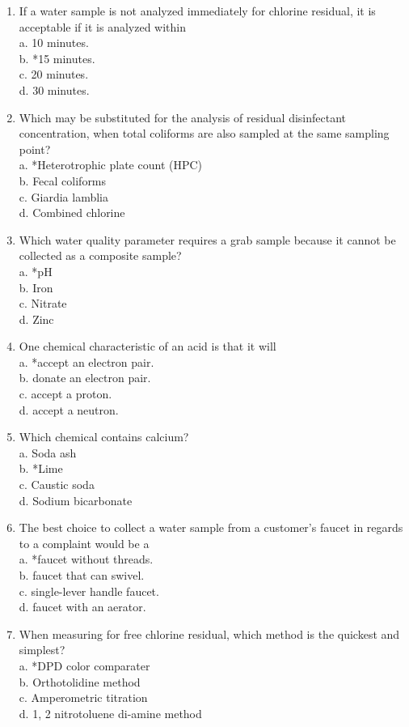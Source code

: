 \documentclass[10pt]{article}
\begin{document}
\begin{enumerate}
  \item If a water sample is not analyzed immediately for chlorine residual, it is acceptable if it is analyzed within\\
a. 10 minutes.\\
b. *15 minutes.\\
c. 20 minutes.\\
d. 30 minutes.

  \item Which may be substituted for the analysis of residual disinfectant concentration, when total coliforms are also sampled at the same sampling point?\\
a. *Heterotrophic plate count (HPC)\\
b. Fecal coliforms\\
c. Giardia lamblia\\
d. Combined chlorine

  \item Which water quality parameter requires a grab sample because it cannot be collected as a composite sample?\\
a. *$\mathrm{pH}$\\
b. Iron\\
c. Nitrate\\
d. Zinc 

	\item One chemical characteristic of an acid is that it will\\
a. *accept an electron pair.\\
b. donate an electron pair.\\
c. accept a proton.\\
d. accept a neutron.

  \item Which chemical contains calcium?\\
a. Soda ash\\
b. *Lime\\
c. Caustic soda\\
d. Sodium bicarbonate

  \item The best choice to collect a water sample from a customer's faucet in regards to a complaint would be a\\
a. *faucet without threads.\\
b. faucet that can swivel.\\
c. single-lever handle faucet.\\
d. faucet with an aerator.

  \item When measuring for free chlorine residual, which method is the quickest and simplest?\\
a. *DPD color comparater\\
b. Orthotolidine method\\
c. Amperometric titration\\
d. 1, 2 nitrotoluene di-amine method


\end{enumerate}
\end{document}
